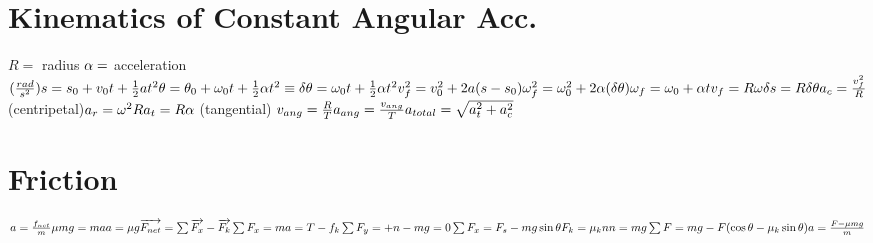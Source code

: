 \documentclass[11pt]{article}
\begin{document}
\begin{paracol}{3}
        \section*{Kinematics of Constant Angular Acc.}
        \begin{fleqn}
            $
            R = $ radius $ \newline
            \alpha = $ acceleration $ (\frac{rad}{s^2}) \newline
            s=s_0 + v_0t + \frac{1}{2}at^2 \newline
            \theta = \theta_0 + \omega_0 t + \frac{1}{2}\alpha t^2 \equiv \delta \theta = \omega_0 t + \frac{1}{2}\alpha t^2 \newline
            v^2_f = v_0^2+2a(s-s_0)  \newline
            \omega^2_f = \omega_0 ^2 + 2 \alpha (\delta \theta) \newline
            \omega_f = \omega_0 + \alpha t  \newline
            v_f = R\omega \newline
            \delta s = R \delta \theta \newline
            a_c = \frac{v^2_f}{R} $ (centripetal)$\newline
            a_r = \omega^{2}R \newline
            a_t = R \alpha $ (tangential) $ \newline
            v_{ang} = \frac{R}{T} \newline
            a_{ang} = \frac{v_{ang}}{T} \newline
            a_{total} = \sqrt{a_t^2+a_c^2}
            $
        \end{fleqn}
        \switchcolumn
        \section*{Friction}
        \begin{fleqn}
            $
            a=\frac{f_{net}}{m} \newline
            \mu mg = ma \newline
            a= \mu g \newline
            \overrightarrow{F_{net}} = \sum \overrightarrow{F_x}-\overrightarrow{F_{k}} \newline
            \sum F_x = ma = T-f_k \newline
            \sum F_y = +n-mg = 0 \newline
            \sum F_x = F_s - mg\sin\theta \newline
            F_k = \mu_{k}n \newline
            n=mg \newline
            \sum F=mg-F(\cos\theta - \mu_k\sin\theta) \newline
            a = \frac{F-\mu mg}{m} \newline
            $
        \end{fleqn}

\end{paracol}
\end{document}
